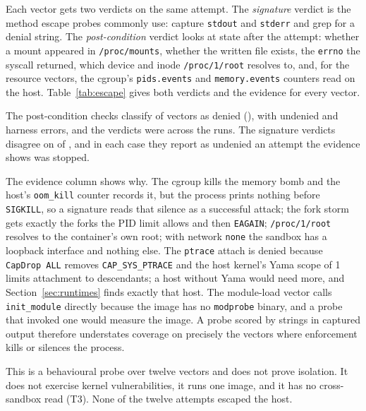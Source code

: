\documentclass[conference]{IEEEtran}
\begin{document}
Each vector gets two verdicts on the same attempt. The \emph{signature}
verdict is the method escape probes commonly use: capture \texttt{stdout}
and \texttt{stderr} and grep for a denial string. The \emph{post-condition} verdict looks at
state after the attempt: whether a mount appeared in \texttt{/proc/mounts},
whether the written file exists, the \texttt{errno} the syscall returned,
which device and inode \texttt{/proc/1/root} resolves to, and, for the
resource vectors, the cgroup's \texttt{pids.events} and
\texttt{memory.events} counters read on the host. Table~\ref{tab:escape}
gives both verdicts and the evidence for every vector.



The post-condition checks classify \BoxedEscapeDenied{} of
\BoxedEscapeTotal{} vectors as denied (\BoxedEscapePct), with
\BoxedEscapeUndenied{} undenied and \BoxedEscapeError{} harness errors, and
the verdicts were \BoxedEscapeConsistent{} across the \BoxedEscapeRuns{}
runs. The signature verdicts disagree on \BoxedEscapeSigDisagree{} of
\BoxedEscapeTotal{}, and in each case they report as undenied an attempt
the evidence shows was stopped.

The evidence column shows why. The cgroup kills the memory bomb and the
host's \texttt{oom\_kill} counter records it, but the process prints
nothing before \texttt{SIGKILL}, so a signature reads that silence as a
successful attack; the fork storm gets exactly the forks the PID limit
allows and then \texttt{EAGAIN}; \texttt{/proc/1/root} resolves to the
container's own root; with network \texttt{none} the sandbox has a
loopback interface and nothing else. The \texttt{ptrace} attach is denied
because \texttt{CapDrop ALL} removes \texttt{CAP\_SYS\_PTRACE} and the
host kernel's Yama scope of 1 limits attachment to descendants; a host
without Yama would need more, and Section~\ref{sec:runtimes} finds exactly
that host. The module-load vector calls \texttt{init\_module} directly
because the image has no \texttt{modprobe} binary, and a probe that
invoked one would measure the image. A probe scored by strings in captured
output therefore understates coverage on precisely the vectors where
enforcement kills or silences the process.

This is a behavioural probe over twelve vectors and does not prove
isolation. It does not exercise kernel vulnerabilities, it runs one image,
and it has no cross-sandbox read (T3). None of the twelve attempts escaped
the host.
\end{document}
